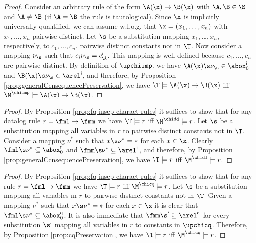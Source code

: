 \datalogAtomicSubsumptionModules*
\begin{proof}
  Consider an arbitrary rule of the form $\A(\x)\to \B(\x)$ with
  $\A,\B\in\S$ and $\A\ne\B$ (if $\A=\B$ the rule is tautological).
  Since $\x$ is implicitly universally quantified, we can assume
  w.l.o.g.  that $\x = (x_1,\dots,x_n)$ with $x_1, \dots,x_n$ pairwise
  distinct. %
  Let $\s$ be a substitution mapping $x_1,\dots,x_n$, respectively, to
  $c_1,\dots,c_n$, pairwise distinct constants not in $\T$.  Now
  consider a mapping $\nu_{\s}$ such that $c_i\nu_{\s} =
  c^i_{\A}$. This mapping is well-defined because $c_1,\dots,c_n$ are
  pairwise distinct. By definition of $\upchiimp$, we have
  $\A(\x)\s\nu_{\s}\in\abox_0^{\mathsf{i}}$ and
  $\B(\x)\s\nu_{\s}\in\arel^{\mathsf{i}}$, and therefore, by
  Proposition \ref{prop:generalConsequencePreservation}, we have
  $\T\models \A(\x)\to\B(\x)$ iff $\M^{\chiimp}\models
  \A(\x)\to\B(\x)$.
\end{proof}

\disjDatalogModules*
\begin{proof}
  By Proposition \ref{prop:fq-insep-charact-rules} it suffices to show
  that for any datalog rule $r=\fml\to\fmm$ we have $\T\models r$ iff
  $\M^{\chidd}\models r$.  Let $\s$ be a substitution mapping all
  variables in $r$ to pairwise distinct constants not in $\T$.
  Consider a mapping $\nu^*$ such that $x\s\nu^* = *$ for each
  $x\in\x$. Clearly $\fml\s\nu^*\subseteq\abox_0^{\mathsf{f}}$ and
  $\fmm\s\nu^*\subseteq\arel^{\mathsf{f}}$, and therefore, by
  Proposition \ref{prop:generalConsequencePreservation}, we have
  $\T\models r$ iff $\M^{\chidd}\models r$.
\end{proof}

\datalogCQModules*
\begin{proof}
  By Proposition \ref{prop:fq-insep-charact-rules} it suffices to show
  that for any rule $r=\fml\to\fmm$ we have $\T\models r$ iff
  $\M^{\chicq}\models r$.  Let $\s$ be a substitution mapping all
  variables in $r$ to pairwise distinct constants not in $\T$.
  Given a mapping $\nu^*$ such that $x\s\nu^* = *$ for each
  $x\in\x$ it is clear that
  $\fml\s\nu^*\subseteq\abox_0^{\mathsf{q}}$.  It is also immediate
  that $\fmm\s'\subseteq\arel^{\mathsf{q}}$ for every substitution
  $\s'$ mapping all variables in $r$ to constants in $\upchicq$.
  Therefore, by Proposition \ref{prop:cqPreservation}, we have 
  $\T\models r$ iff $\M^{\chicq}\models r$.
\end{proof}

